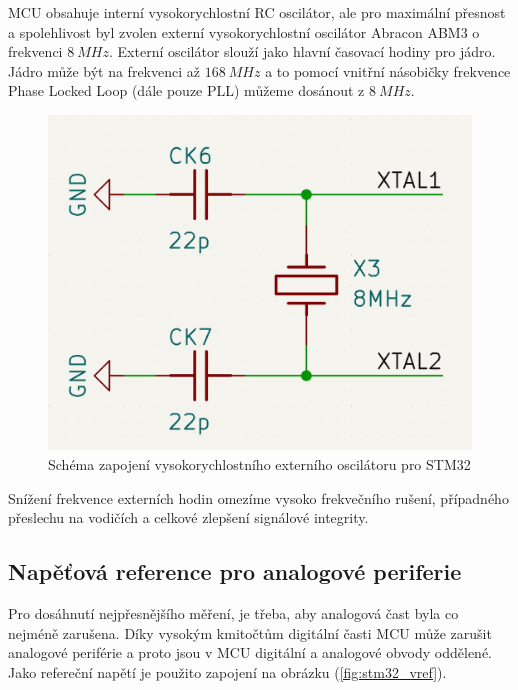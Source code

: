 MCU obsahuje interní vysokorychlostní RC oscilátor, ale pro maximální přesnost a spolehlivost byl zvolen externí vysokorychlostní oscilátor Abracon ABM3 o frekvenci  $8 \ MHz$. Externí oscilátor slouží jako hlavní časovací hodiny pro
jádro. Jádro může být na frekvenci až $168 \ MHz$ a to pomocí vnitřní násobičky frekvence Phase Locked Loop (dále pouze PLL) můžeme dosánout z $8 \ MHz$.

\begin{figure}[H]
    \centering
    \includegraphics[width=0.8\linewidth]{pictures/stm32_hse.jpg}
    \caption{Schéma zapojení vysokorychlostního externího oscilátoru pro STM32}
    \label{fig:stm32_hse}
\end{figure}

Snížení frekvence externích hodin omezíme vysoko frekvečního rušení, případného přeslechu na vodičích a celkové zlepšení signálové integrity.


\subsection{Napěťová reference pro analogové periferie} \label{section:vref}
Pro dosáhnutí nejpřesnějšího měření, je třeba, aby analogová čast byla co nejméně zarušena. Díky vysokým kmitočtům digitální časti MCU může zarušit analogové periférie a proto jsou v MCU digitální a analogové obvody oddělené.
Jako refereční napětí je použito zapojení na obrázku (\ref{fig:stm32_vref}).

